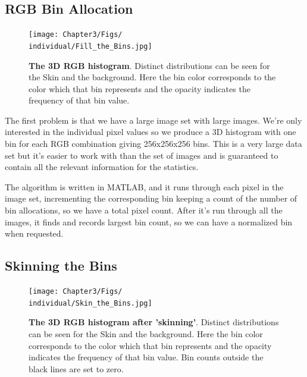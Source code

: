 

\subsection{RGB Bin Allocation}\label{sec:RGBBinAllocation}


\def\individual{FSkin}


\begin{figure}[h!]
  \centering
    \texttt{[image: Chapter3/Figs/\\individual/Fill\_the\_Bins.jpg]}
        \caption{\textbf{The 3D RGB histogram}. Distinct distributions can be seen for the Skin and the background. Here the bin color corresponds to the color which that bin represents and the opacity indicates the frequency of that bin value. }  \label{fig:Fill_the_Bins}
    \end{figure}

The first problem is that we have a large image set with large images. We're only interested in the individual pixel values so we produce a 3D histogram with one bin for each RGB combination giving 256x256x256 bins. This is a very large data set but it's easier to work with than the set of images and is guaranteed to contain all the relevant information for the statistics.

The algorithm is written in MATLAB, and it runs through each pixel in the image set, incrementing the corresponding bin keeping a count of the number of bin allocations, so we have a total pixel count. After it's run through all the images, it finds and records largest bin count, so we can have a normalized bin when requested.


\subsection{Skinning the Bins}\label{sec:SkinningTheBins}

\begin{figure}[h!] %
  \centering
    \texttt{[image: Chapter3/Figs/\\individual/Skin\_the\_Bins.jpg]}
        \caption{\textbf{The 3D RGB histogram after 'skinning'}. Distinct distributions can be seen for the Skin and the background. Here the bin color corresponds to the color which that bin represents and the opacity indicates the frequency of that bin value. Bin counts outside the black lines are set to zero. }  \label{fig:Skin_the_Bins}
    \end{figure}

